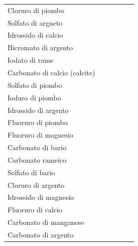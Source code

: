 \hspace{-1cm}\footnotesize\begin{tabular}{p{4cm}p{1.6cm}p{2cm}p{4cm}p{1.6cm}p{2cm}}
    
    
    Cloruro di piombo&&&&&\\[0.7ex]
    Solfato di argneto&&&&&\\[0.7ex]
    Idrossido di calcio&&&&&\\[0.7ex]
    Bicromato di argento&&&&&\\[0.7ex]
    Iodato di rame&&&&&\\[0.7ex]
    Carbonato di calcio (calcite)&&&&&\\[0.7ex]
    Solfato di piombo&&&&&\\[0.7ex]
    Ioduro di piombo&&&&&\\[0.7ex]
    Idrossido di argento&&&&&\\[0.7ex]
    Fluoruro di piombo&&&&&\\[0.7ex]
    Fluoruro di magnesio&&&&&\\[0.7ex]
    Carbonato di bario&&&&&\\[0.7ex]
    Carbonato rameico&&&&&\\[0.7ex]
    Solfato di bario&&&&&\\[0.7ex]
    Cloruro di argento&&&&&\\[0.7ex]
    Idrossido di magnesio&&&&&\\[0.7ex]
    Fluoruro di calcio&&&&&\\[0.7ex]
    Carbonato di manganese&&&&&\\[0.7ex]
    Carbonato di argento&&&&&\\[0.7ex]

\end{tabular}


